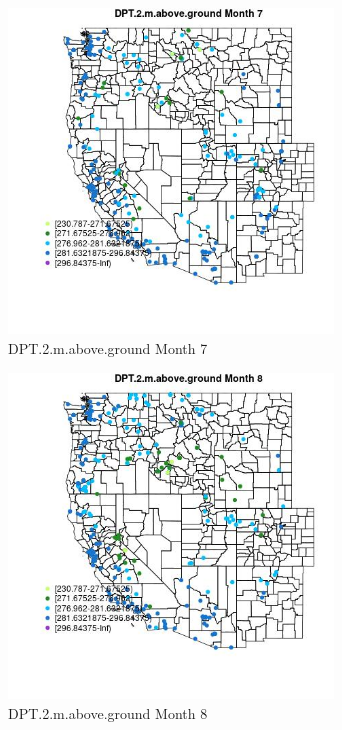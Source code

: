 \begin{figure} 
\centering  
\includegraphics[width=0.77\textwidth]{Code_Outputs/Report_ML_input_PM25_Step4_part_e_de_duplicated_aveswNAs_MapObsMo7DPT2maboveground.jpg} 
\caption{\label{fig:Report_ML_input_PM25_Step4_part_e_de_duplicated_aveswNAsMapObsMo7DPT2maboveground}DPT.2.m.above.ground Month 7} 
\end{figure} 
 

\clearpage 

\begin{figure} 
\centering  
\includegraphics[width=0.77\textwidth]{Code_Outputs/Report_ML_input_PM25_Step4_part_e_de_duplicated_aveswNAs_MapObsMo8DPT2maboveground.jpg} 
\caption{\label{fig:Report_ML_input_PM25_Step4_part_e_de_duplicated_aveswNAsMapObsMo8DPT2maboveground}DPT.2.m.above.ground Month 8} 
\end{figure} 
 

